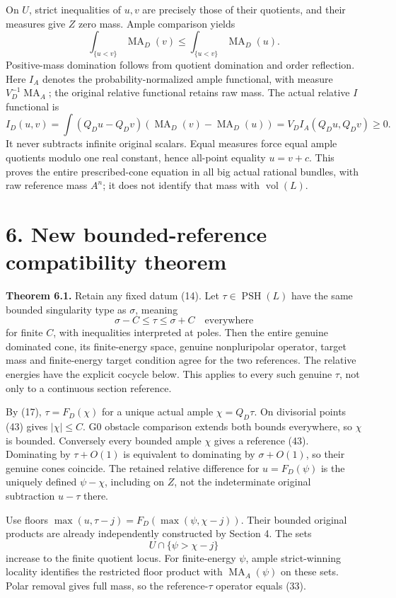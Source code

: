 \documentclass[
  10pt,
]{article}
\begin{document}
On \(U\), strict inequalities of \(u,v\) are precisely those of their
quotients, and their measures give \(Z\) zero mass. Ample comparison
yields \[\int_{\{u<v\}}\operatorname{MA}_D(v)\leq
\int_{\{u<v\}}\operatorname{MA}_D(u).\tag{41}\] Positive-mass domination
follows from quotient domination and order reflection. Here \(I_A\)
denotes the probability-normalized ample functional, with measure
\(V_D^{-1}\operatorname{MA}_A\); the original relative functional
retains raw mass. The actual relative \(I\) functional is
\[I_D(u,v)=\int(Q_Du-Q_Dv)(\operatorname{MA}_D(v)-\operatorname{MA}_D(u))
=V_D I_A(Q_Du,Q_Dv)\geq0.\tag{42}\] It never subtracts infinite original
scalars. Equal measures force equal ample quotients modulo one real
constant, hence all-point equality \(u=v+c\). This proves the entire
prescribed-cone equation in all big actual rational bundles, with raw
reference mass \(A^n\); it does not identify that mass with
\(\operatorname{vol}(L)\).

\section{6. New bounded-reference compatibility
theorem}\label{new-bounded-reference-compatibility-theorem}

\textbf{Theorem 6.1.} Retain any fixed datum (14). Let
\(\tau\in\operatorname{PSH}(L)\) have the same bounded singularity type
as \(\sigma\), meaning
\[\sigma-C\leq\tau\leq\sigma+C\quad\text{everywhere}\tag{43}\] for
finite \(C\), with inequalities interpreted at poles. Then the entire
genuine dominated cone, its finite-energy space, genuine nonpluripolar
operator, target mass and finite-energy target condition agree for the
two references. The relative energies have the explicit cocycle below.
This applies to every such genuine \(\tau\), not only to a continuous
section reference.

By (17), \(\tau=F_D(\chi)\) for a unique actual ample \(\chi=Q_D\tau\).
On divisorial points (43) gives \(|\chi|\leq C\). G0 obstacle comparison
extends both bounds everywhere, so \(\chi\) is bounded. Conversely every
bounded ample \(\chi\) gives a reference (43). Dominating by
\(\tau+O(1)\) is equivalent to dominating by \(\sigma+O(1)\), so their
genuine cones coincide. The retained relative difference for
\(u=F_D(\psi)\) is the uniquely defined \(\psi-\chi\), including on
\(Z\), not the indeterminate original subtraction \(u-\tau\) there.

Use floors \(\max(u,\tau-j)=F_D(\max(\psi,\chi-j))\). Their bounded
original products are already independently constructed by Section 4.
The sets \[U\cap\{\psi>\chi-j\}\] increase to the finite quotient locus.
For finite-energy \(\psi\), ample strict-winning locality identifies the
restricted floor product with \(\operatorname{MA}_A(\psi)\) on these
sets. Polar removal gives full mass, so the reference-\(\tau\) operator
equals (33).
\end{document}
